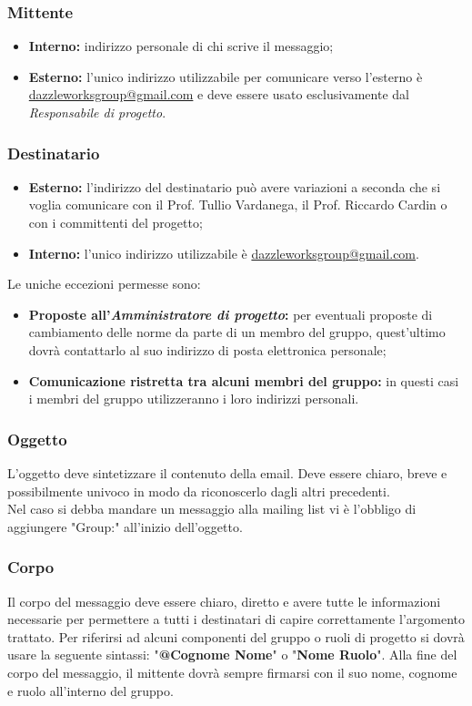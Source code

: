 		\subsubsection{Mittente}
\begin{itemize}
	\item \textbf{Interno:} indirizzo personale di chi scrive il messaggio;
	\item \textbf{Esterno:} l'unico indirizzo utilizzabile per comunicare verso l'esterno è \url{dazzleworksgroup@gmail.com} e deve essere usato esclusivamente dal \textit{Responsabile di progetto}.
\end{itemize}
	\subsubsection{Destinatario}
\begin{itemize}
	\item \textbf{Esterno:} l'indirizzo del destinatario può avere variazioni a seconda che si voglia comunicare con il Prof. Tullio Vardanega, il Prof. Riccardo Cardin o con i committenti del progetto;
	\item \textbf{Interno:} l'unico indirizzo utilizzabile è \url{dazzleworksgroup@gmail.com}.
\end{itemize}
Le uniche eccezioni permesse sono:
\begin{itemize}
	\item \textbf{Proposte all'\textit{Amministratore di progetto}:} per eventuali proposte di cambiamento delle norme da parte di un membro del gruppo, quest'ultimo dovrà contattarlo al suo indirizzo di posta elettronica personale;
	\item \textbf{Comunicazione ristretta tra alcuni membri del gruppo:} in questi casi i membri del gruppo utilizzeranno i loro indirizzi personali.
\end{itemize}

		\subsubsection{Oggetto}
L'oggetto deve sintetizzare il contenuto della email. Deve essere chiaro, breve e possibilmente univoco in modo da riconoscerlo dagli altri precedenti.\\
Nel caso si debba mandare un messaggio alla \gls{mailing list} vi è l'obbligo di aggiungere "Group:" all'inizio dell'oggetto.
		\subsubsection{Corpo}
Il corpo del messaggio deve essere chiaro, diretto e avere tutte le informazioni necessarie per permettere a tutti i destinatari di capire correttamente l'argomento trattato. Per riferirsi ad alcuni componenti del gruppo o ruoli di progetto si dovrà usare la seguente sintassi: "\textbf{@Cognome Nome}" o "\textbf{Nome Ruolo}". Alla fine del corpo del messaggio, il mittente dovrà sempre firmarsi con il suo nome, cognome e ruolo all'interno del gruppo.
